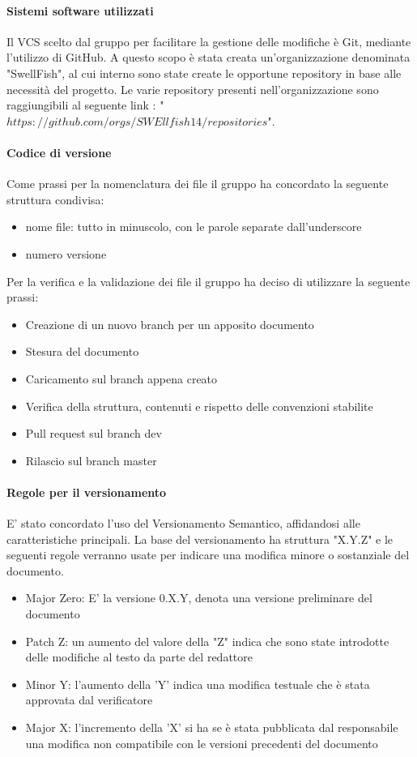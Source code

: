 \documentclass[12pt]{article}
\begin{document}
\paragraph{Sistemi software utilizzati}
Il VCS scelto dal gruppo per facilitare la gestione delle modifiche è Git, mediante l'utilizzo di GitHub.
A questo scopo è stata creata un'organizzazione denominata "SwellFish", al cui interno sono state create le opportune repository in base alle necessità del progetto.
Le varie repository presenti nell'organizzazione sono raggiungibili al seguente link : "$https://github.com/orgs/SWEllfish14/repositories$".

\paragraph{Codice di versione}
Come prassi per la nomenclatura dei file il gruppo ha concordato la seguente struttura condivisa:
\begin{itemize}
    \item nome file: tutto in minuscolo, con le parole separate dall'underscore
    \item numero versione
\end{itemize}

Per la verifica e la validazione dei file il gruppo ha deciso di utilizzare la seguente prassi:
\begin{itemize}
    \item Creazione di un nuovo branch per un apposito documento
    \item Stesura del documento
    \item Caricamento sul branch appena creato
    \item Verifica della struttura, contenuti e rispetto delle convenzioni stabilite
    \item Pull request sul branch dev
    \item Rilascio sul branch master
\end{itemize}

\paragraph{Regole per il versionamento}
\label{ver}
E' stato concordato l'uso del Versionamento Semantico, affidandosi alle caratteristiche principali.
La base del versionamento ha struttura "X.Y.Z" e le seguenti regole verranno usate per indicare una modifica minore o sostanziale del documento.
\begin{itemize}
    \item Major Zero: E' la versione 0.X.Y, denota una versione preliminare del documento
    \item Patch Z: un aumento del valore della "Z" indica che sono state introdotte delle modifiche al testo da parte del redattore
    \item Minor Y: l'aumento della 'Y' indica una modifica testuale che è stata approvata dal verificatore
    \item Major X: l'incremento della 'X' si ha se è stata pubblicata dal responsabile una modifica non compatibile con le versioni precedenti del documento
\end{itemize}
\end{document}
